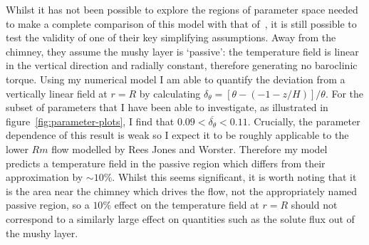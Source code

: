 \documentclass[11pt]{proc}
\begin{document}
Whilst it has not been possible to explore the regions of parameter space needed to make a complete comparison of this model with that of~\citet*{rees-jones-worster-13}, it is still possible to test the validity of one of their key simplifying assumptions. Away from the chimney, they assume the mushy layer is `passive': the temperature field is linear in the vertical direction and radially constant, therefore generating no baroclinic torque. Using my numerical model I am able to quantify the deviation from a vertically linear field at $r=R$ by calculating $ \delta_\theta = \left[\theta - (-1-z/H)\right] / \theta$. For the subset of parameters that I have been able to investigate, as illustrated in figure~\ref{fig:parameter-plots}, I find that $ 0.09 < \overline{ \delta_\theta} < 0.11 $. Crucially, the parameter dependence of this result is weak so I expect it to be roughly applicable to the lower $Rm$ flow modelled by Rees Jones and Worster. Therefore my model predicts a temperature field in the passive region which differs from their approximation by $\sim10\%$. Whilst this seems significant, it is worth noting that it is the area near the chimney which drives the flow, not the appropriately named passive region, so a $10\%$ effect on the temperature field at $r=R$ should not correspond to a similarly large effect on quantities such as the solute flux out of the mushy layer.

\end{document}
